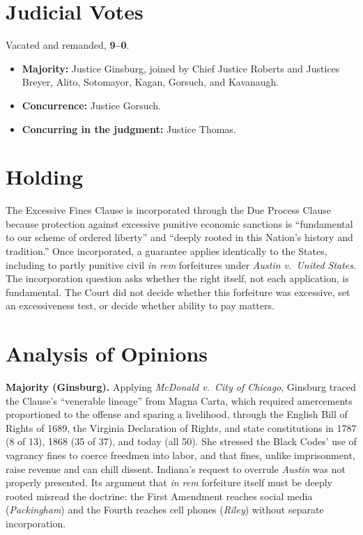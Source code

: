 \documentclass[12pt]{article}
\begin{document}
\section{Judicial Votes}

Vacated and remanded, \textbf{9--0}.
\begin{itemize}
\item \textbf{Majority:} Justice Ginsburg, joined by Chief Justice Roberts and Justices Breyer, Alito, Sotomayor, Kagan, Gorsuch, and Kavanaugh.
\item \textbf{Concurrence:} Justice Gorsuch.
\item \textbf{Concurring in the judgment:} Justice Thomas.
\end{itemize}

\section{Holding}

The Excessive Fines Clause is incorporated through the Due Process Clause because protection against excessive punitive economic sanctions is ``fundamental to our scheme of ordered liberty'' and ``deeply rooted in this Nation's history and tradition.'' Once incorporated, a guarantee applies identically to the States, including to partly punitive civil \textit{in rem} forfeitures under \textit{Austin v.\ United States}. The incorporation question asks whether the right itself, not each application, is fundamental. The Court did not decide whether this forfeiture was excessive, set an excessiveness test, or decide whether ability to pay matters.

\section{Analysis of Opinions}

\textbf{Majority (Ginsburg).} Applying \textit{McDonald v.\ City of Chicago}, Ginsburg traced the Clause's ``venerable lineage'' from Magna Carta, which required amercements proportioned to the offense and sparing a livelihood, through the English Bill of Rights of 1689, the Virginia Declaration of Rights, and state constitutions in 1787 (8 of 13), 1868 (35 of 37), and today (all 50). She stressed the Black Codes' use of vagrancy fines to coerce freedmen into labor, and that fines, unlike imprisonment, raise revenue and can chill dissent. Indiana's request to overrule \textit{Austin} was not properly presented. Its argument that \textit{in rem} forfeiture itself must be deeply rooted misread the doctrine: the First Amendment reaches social media (\textit{Packingham}) and the Fourth reaches cell phones (\textit{Riley}) without separate incorporation.
\end{document}
